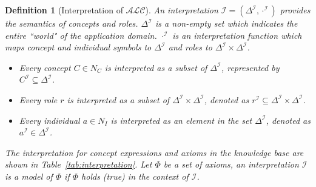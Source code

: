 \documentclass{article}
\newtheorem{mydef}{Definition}
\begin{document}
\begin{mydef}[Interpretation of $\mathcal{ALC}$]
An interpretation $\mathcal{I}=(\Delta^\mathcal{I},\cdot^\mathcal{I})$ provides the semantics of concepts and roles. $\Delta^\mathcal{I}$ is a non-empty set which indicates the entire
``world" of the application domain. $\cdot^\mathcal{I}$ is an interpretation function which maps concept and individual symbols to $\Delta^\mathcal{I}$ and roles to $\Delta^\mathcal{I} \times \Delta^\mathcal{I}$.
\begin{itemize}
 \item Every concept $C\in N_C$ is interpreted as a subset of $\Delta^\mathcal{I}$, represented by $C^\mathcal{I}\subseteq \Delta^\mathcal{I}$.
 \item Every  role $r$ is interpreted as a subset of $\Delta^\mathcal{I}\times\Delta^\mathcal{I}$, denoted as $r^\mathcal{I}\subseteq \Delta^\mathcal{I}\times\Delta^\mathcal{I}$.
 \item Every individual $a \in N_I$ is interpreted as an element in the set $\Delta^\mathcal{I}$, denoted as $a^\mathcal{I} \in \Delta^\mathcal{I}$.
\end{itemize}
The interpretation for concept expressions and axioms in the knowledge base are shown in Table~\ref{tab:interpretation}.
Let $\varPhi$ be a set of axioms, an interpretation $\mathcal{I}$ is a \textit{model} of $\varPhi$ if $\varPhi$ holds (true) in the context of $\mathcal{I}$.
\end{mydef}
\end{document}
